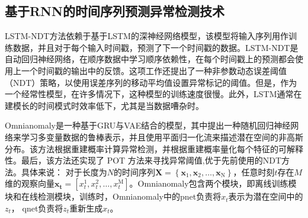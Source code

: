 \subsection{基于RNN的时间序列预测异常检测技术}
LSTM-NDT\cite{lstm-ndt}方法依赖于基于LSTM的深神经网络模型，该模型将输入序列用作训练数据，并且对于每个输入时间戳，预测了下一个时间戳的数据。LSTM-NDT是自动回归神经网络，在顺序数据中学习顺序依赖性，在每个时间戳上的预测都会使用上一个时间戳的输出中的反馈。这项工作还提出了一种非参数动态误差阈值（NDT）策略，以使用误差序列的移动平均值设置异常标记的阈值。但是，作为一个经常性模型，在许多情况下，这种模型的训练速度很慢。此外，LSTM通常在建模长的时间模式时效率低下，尤其是当数据嘈杂时。

Omnianomaly\cite{Omnianomaly}是一种基于GRU与VAE结合的模型，其中提出一种随机回归神经网络来学习多变量数据的鲁棒表示，并且使用平面归一化流\cite{realnvp}来描述潜在空间的非高斯分布。该方法根据重建概率计算异常检测，并根据重建概率量化每个特征的可解释性。最后，该方法还实现了 POT 方法来寻找异常阈值,优于先前使用的NDT方法。具体来说： 对于长度为$N$的时间序列$\mathbf{X}=\left\{\mathbf{x}_1, \mathbf{x}_2, \ldots, \mathbf{x}_{\mathrm{N}}\right\}$，任意时刻$t$存在$M$维的观察向量$\mathbf{x}_{\mathbf{t}}=\left[x_t^1, x_t^2, \ldots, x_t^{\mathrm{M}}\right]$。Omnianomaly包含两个模块，即离线训练模块和在线检测模块，训练时，Omnianomaly中的pnet负责将$x_t$表示为潜在空间中的$z_t$， qnet负责将$z_t$重新生成$x_t$。

